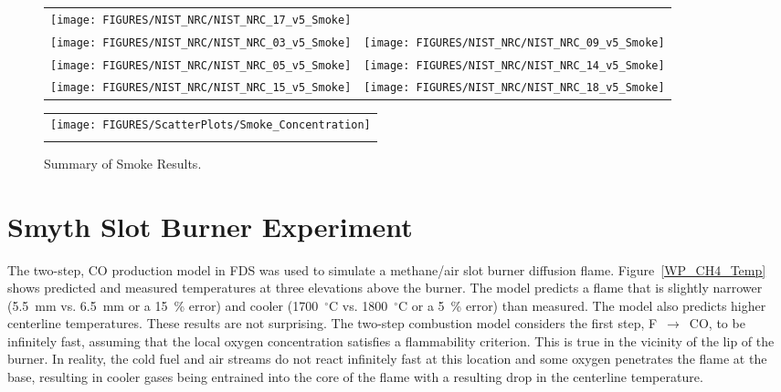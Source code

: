 \begin{figure}[p]
\begin{tabular*}{\textwidth}{l@{\extracolsep{\fill}}r}
\texttt{[image: FIGURES/NIST\_NRC/NIST\_NRC\_17\_v5\_Smoke]} &
 \\
\texttt{[image: FIGURES/NIST\_NRC/NIST\_NRC\_03\_v5\_Smoke]} &
\texttt{[image: FIGURES/NIST\_NRC/NIST\_NRC\_09\_v5\_Smoke]} \\
\texttt{[image: FIGURES/NIST\_NRC/NIST\_NRC\_05\_v5\_Smoke]} &
\texttt{[image: FIGURES/NIST\_NRC/NIST\_NRC\_14\_v5\_Smoke]} \\
\texttt{[image: FIGURES/NIST\_NRC/NIST\_NRC\_15\_v5\_Smoke]} &
\texttt{[image: FIGURES/NIST\_NRC/NIST\_NRC\_18\_v5\_Smoke]}
\end{tabular*}
\end{figure}



\begin{figure}[p]
\begin{center}
\begin{tabular}{c}
\texttt{[image: FIGURES/ScatterPlots/Smoke\_Concentration]} \\
\vspace{0.25in} \\
\end{tabular}
\end{center}
\caption{Summary of Smoke Results.}
\end{figure}



\clearpage

\section{Smyth Slot Burner Experiment}

The two-step, CO production model in FDS was used to simulate a methane/air slot burner diffusion flame.  Figure~\ref{WP_CH4_Temp} shows predicted and
measured temperatures at three elevations above the burner.  The model predicts a flame that is slightly narrower
(5.5~mm vs. 6.5~mm or a 15~\% error) and cooler (1700~$^\circ$C vs. 1800~$^\circ$C or a 5~\% error) than measured.  The model
also predicts higher centerline temperatures.  These results are not surprising.  The two-step combustion model considers
the first step, F~$\longrightarrow$~CO, to be infinitely fast, assuming that the local oxygen concentration satisfies a
flammability criterion.  This is true in the vicinity of the lip of the burner.  In reality, the cold fuel and air
streams do not react infinitely fast at this location and some oxygen penetrates the flame at the base, resulting in cooler
gases being entrained into the core of the flame with a resulting drop in the centerline temperature.

